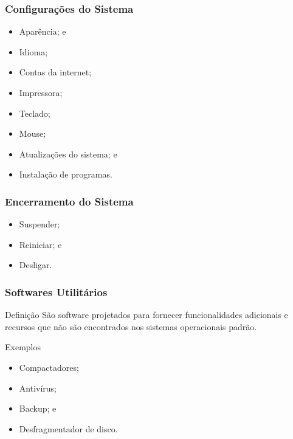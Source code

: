 \documentclass[aspectratio=169]{beamer} %
\begin{document}
\begin{frame}
	\frametitle{Configura\c cões do Sistema}
	
	\begin{itemize}
		\item Aparência; e
		\item Idioma;
		\item Contas da internet;
		\item Impressora;
		\item Teclado;
		\item Mouse;
		\item Atualiza\c cões do sistema; e
		\item Instala\c cão de programas.
	\end{itemize}
\end{frame}

\begin{frame}
	\frametitle{Encerramento do Sistema}
	
	\begin{itemize}
		\item Suspender;
		\item Reiniciar; e
		\item Desligar.
	\end{itemize}
\end{frame}

\begin{frame}
	\frametitle{Softwares Utilitários}
	
	\begin{block}{Defini\c cão}
		São software projetados para fornecer funcionalidades adicionais e recursos que não são encontrados nos sistemas operacionais padrão.
	\end{block}\vfill
	
	\begin{exampleblock}{Exemplos}
		\begin{itemize}
			\item Compactadores;
			\item Antivírus;
			\item Backup; e
			\item Desfragmentador de disco.
		\end{itemize}
	\end{exampleblock}
\end{frame}
\end{document}
